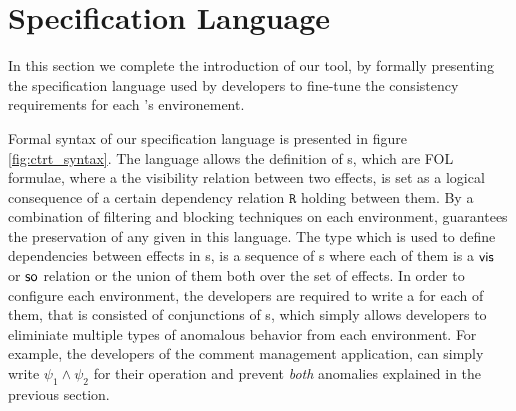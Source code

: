 \section {Specification Language} 
\label{sec:ctrt_language}

In this section we complete the introduction of our tool, by formally
presenting the specification language used by developers to fine-tune
the consistency requirements for each \tool's environement.

Formal syntax of our specification language is presented in
figure \ref{fig:ctrt_syntax}.
The language allows the definition of  \propS{}s, which are FOL formulae, where a 
the visibility relation between two effects, is set as a logical
consequence of a certain dependency relation $\mathtt{R}$ holding between them.
By a combination of filtering and blocking
techniques on each environment, \tool guarantees the preservation of any
given \propS{} in this language.
The type \relationS{} which is used to define dependencies between
effects in \propS{}s, is a sequence of \seedS{}s where each of them is a ${\normalfont \textsf{vis}}$ or 
${\normalfont \textsf{so}}$ relation or the union of them both over the set of effects. In order to
configure each environment, the developers are required to write a
\specS{} for each of them, that is consisted of conjunctions of \propS{}s, which
simply allows developers to eliminiate multiple types of anomalous
behavior from each environment. For example, the developers of the
comment management application, can simply write $\psi_1\wedge \psi_2$
for their \readC{} operation and prevent \emph{both} anomalies explained
in the previous section.

